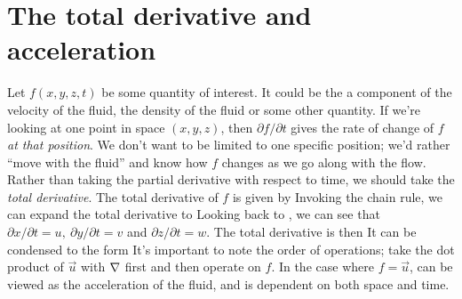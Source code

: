\documentclass[12pt]{book}
\begin{document}
\section{The total derivative and acceleration}
Let $f(x,y,z,t)$ be some quantity of interest.  It could be the a component of the velocity of the fluid, the density of the fluid or some other quantity.  If we're looking at one point in space $(x,y,z)$, then $\partial f / \partial t$ gives the rate of change of $f$ \textit{at that position}.  We don't want to be limited to one specific position; we'd rather ``move with the fluid'' and know how $f$ changes as we go along with the flow.  Rather than taking the partial derivative with respect to time, we should take the \textit{total derivative}.  The total derivative of $f$ is given by
Invoking the chain rule, we can expand the total derivative to
Looking back to , we can see that $\partial x / \partial t = u,\  \partial y / \partial t = v$ and $\partial z / \partial t = w$.  The total derivative is then
It can be condensed to the form
It's important to note the order of operations; take the dot product of $\vec u$ with $\Nabla$ first and then operate on $f$.
In the case where $f=\vec u$,  can be viewed as the acceleration of the fluid, and is dependent on both space and time.

\end{document}
